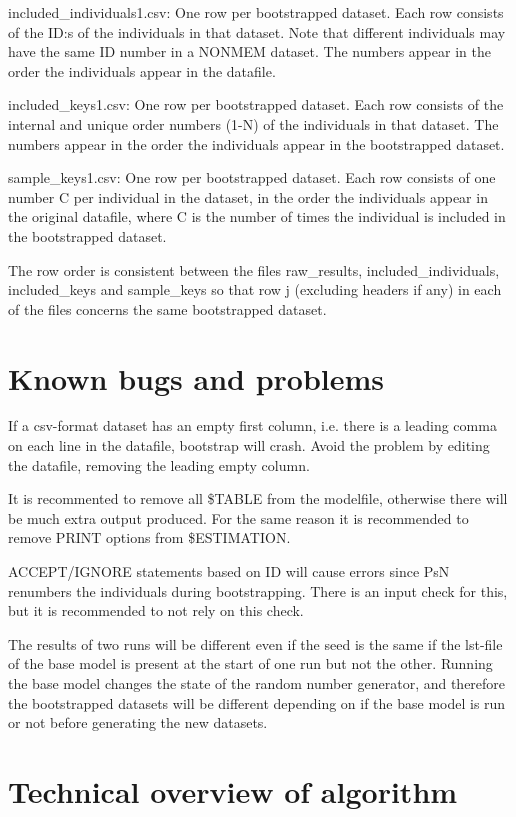 \documentclass[a4paper,12pt]{article}
\begin{document}
included\_individuals1.csv: One row per bootstrapped dataset. Each row consists of the ID:s of the individuals in that dataset. Note that different individuals may have the same ID number in a NONMEM dataset. The numbers appear in the order the individuals appear in the datafile.

included\_keys1.csv: One row per bootstrapped dataset. Each row consists of the internal and unique order numbers (1-N) of the individuals in that dataset. The numbers appear in the order the individuals appear in the bootstrapped dataset. 

sample\_keys1.csv:  One row per bootstrapped dataset. Each row consists of one number C per individual in the dataset, in the order the individuals appear in the original datafile, where C is the number of times the individual is included in the bootstrapped dataset. 

The row order is consistent between the files raw\_results, included\_individuals, included\_keys and sample\_keys so that row j (excluding headers if any) in each of the files concerns the same bootstrapped dataset.

\section{Known bugs and problems}

If a csv-format dataset has an empty first column, i.e. there is a leading comma on each line in the datafile, bootstrap will crash. Avoid the problem by editing the datafile, removing the leading empty column.

It is recommented to remove all \$TABLE from the modelfile, otherwise there will be much extra output produced. For the same reason it is recommended to remove PRINT options from \$ESTIMATION. 

ACCEPT/IGNORE statements based on ID will cause errors since PsN renumbers the individuals during bootstrapping. There is an input check for this, but it is recommended to not rely on this check.

The results of two runs will be different even if the seed is the same if the lst-file of the base model is present at the start of one run but not the other. Running the base model changes the state of the random number generator, and therefore the bootstrapped datasets will be different depending on if the base model is run or not before generating the  new datasets. 

\section{Technical overview of algorithm}
\end{document}
